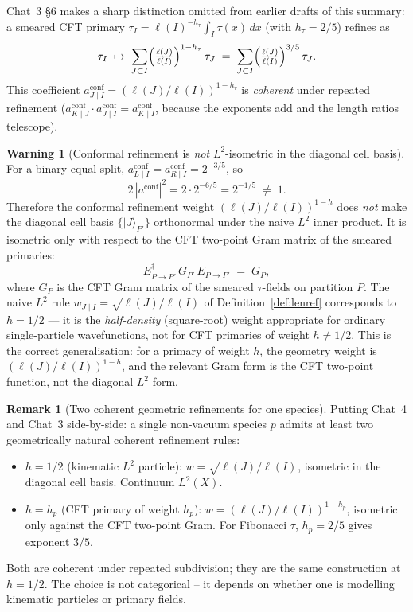 \documentclass[11pt,a4paper]{article}
\theoremstyle{definition}
\newtheorem{remark}[definition]{Remark}
\newtheorem{warning}[definition]{Warning}
\begin{document}
Chat~3 \S6 makes a sharp distinction omitted from earlier drafts of this
summary: a smeared CFT primary $\tau_I = \ell(I)^{-h_\tau}\int_I \tau(x)\,dx$
(with $h_\tau = 2/5$) refines as
\[
\tau_I \;\mapsto\; \sum_{J\subset I}
       \Bigl(\tfrac{\ell(J)}{\ell(I)}\Bigr)^{1 - h_\tau}\,\tau_J
\;=\;  \sum_{J\subset I}\Bigl(\tfrac{\ell(J)}{\ell(I)}\Bigr)^{3/5}\,\tau_J.
\]
This coefficient $a_{J\mid I}^{\mathrm{conf}} = (\ell(J)/\ell(I))^{1-h_\tau}$
is \emph{coherent} under repeated refinement
($a_{K\mid J}^{\mathrm{conf}}\cdot a_{J\mid I}^{\mathrm{conf}}
= a_{K\mid I}^{\mathrm{conf}}$, because the exponents add and the length
ratios telescope).

\begin{warning}[Conformal refinement is \emph{not} $L^{2}$-isometric in the diagonal cell basis]
For a binary equal split,
$a^{\mathrm{conf}}_{L\mid I} = a^{\mathrm{conf}}_{R\mid I} = 2^{-3/5}$, so
\[
2\,|a^{\mathrm{conf}}|^{2} = 2\cdot 2^{-6/5} = 2^{-1/5} \;\neq\; 1.
\]
Therefore the conformal refinement weight $(\ell(J)/\ell(I))^{1-h}$ does
\emph{not} make the diagonal cell basis $\{|J\rangle_{P'}\}$ orthonormal
under the naive $L^{2}$ inner product. It is isometric only with respect to
the CFT two-point Gram matrix of the smeared primaries:
\[
E^{\dagger}_{P\to P'}\,G_{P'}\,E_{P\to P'} \;=\; G_{P},
\]
where $G_P$ is the CFT Gram matrix of the smeared $\tau$-fields on partition
$P$. The naive $L^{2}$ rule $w_{J\mid I} = \sqrt{\ell(J)/\ell(I)}$ of
Definition~\ref{def:lenref} corresponds to $h = 1/2$ --- it is the
\emph{half-density} (square-root) weight appropriate for ordinary single-particle
wavefunctions, not for CFT primaries of weight $h \ne 1/2$. This is the
correct generalisation: for a primary of weight $h$, the geometry weight is
$(\ell(J)/\ell(I))^{1-h}$, and the relevant Gram form is the CFT two-point
function, not the diagonal $L^{2}$ form.
\end{warning}

\begin{remark}[Two coherent geometric refinements for one species]
Putting Chat~4 and Chat~3 side-by-side: a single non-vacuum species $p$
admits at least two geometrically natural coherent refinement rules:
\begin{itemize}
\item $h = 1/2$ (kinematic $L^{2}$ particle): $w = \sqrt{\ell(J)/\ell(I)}$,
      isometric in the diagonal cell basis. Continuum $L^{2}(X)$.
\item $h = h_p$ (CFT primary of weight $h_p$):
      $w = (\ell(J)/\ell(I))^{1-h_p}$, isometric only against the CFT
      two-point Gram. For Fibonacci $\tau$, $h_p = 2/5$ gives exponent
      $3/5$.
\end{itemize}
Both are coherent under repeated subdivision; they are the same construction
at $h=1/2$. The choice is not categorical -- it depends on whether one is
modelling kinematic particles or primary fields.
\end{remark}
\end{document}
